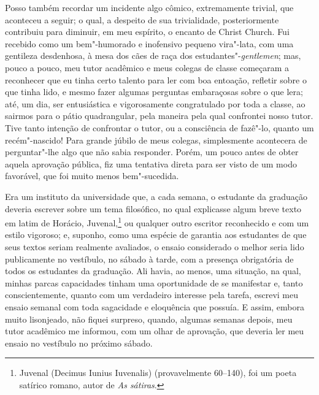 Posso também recordar um incidente algo cômico, extremamente
trivial, que aconteceu a seguir; o qual, a despeito de sua trivialidade,
posteriormente contribuiu para diminuir, em meu espírito, o encanto de
Christ Church. Fui recebido como um bem"-humorado e inofensivo pequeno
vira"-lata, com uma gentileza desdenhosa, à mesa dos cães de raça dos
estudantes"-\textit{gentlemen}; mas, pouco a pouco, meu tutor acadêmico e
meus colegas de classe começaram a reconhecer que eu tinha certo talento
para ler com boa entoação, refletir sobre o que tinha lido, e mesmo
fazer algumas perguntas embaraçosas sobre o que lera; até, um dia, ser
entusiástica e vigorosamente congratulado por toda a classe, ao sairmos
para o pátio quadrangular, pela maneira pela qual confrontei nosso
tutor. Tive tanto intenção de confrontar o tutor, ou a consciência de
fazê"-lo, quanto um recém"-nascido! Para grande júbilo de meus colegas,
simplesmente acontecera de perguntar"-lhe algo que não sabia responder.
Porém, um pouco antes de obter aquela aprovação pública, fiz uma
tentativa direta para ser visto de um modo favorável, que foi muito
menos bem"-sucedida.

Era um instituto da universidade que, a cada semana, o estudante da
graduação deveria escrever sobre um tema filosófico, no qual explicasse
algum breve texto em latim de Horácio, Juvenal,\footnote{Juvenal (Decimus
  Iunius Iuvenalis) (provavelmente 60--140), foi um poeta satírico romano, autor
  de \textit{As sátiras}.} ou qualquer outro escritor
reconhecido e com um estilo vigoroso; e, suponho, como uma espécie de
garantia aos estudantes de que seus textos seriam realmente avaliados, o
ensaio considerado o melhor seria lido publicamente no vestíbulo, no
sábado à tarde, com a presença obrigatória de todos os estudantes da
graduação. Ali havia, ao menos, uma situação, na qual, minhas parcas
capacidades tinham uma oportunidade de se manifestar e, tanto
conscientemente, quanto com um verdadeiro interesse pela tarefa, escrevi
meu ensaio semanal com toda sagacidade e eloquência que possuía. E
assim, embora muito lisonjeado, não fiquei surpreso, quando, algumas
semanas depois, meu tutor acadêmico me informou, com um olhar de
aprovação, que deveria ler meu ensaio no vestíbulo no próximo sábado.

